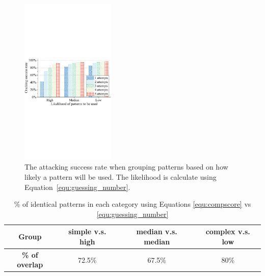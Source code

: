      \begin{figure}[!t]
            \centering
            \includegraphics[width=0.4\textwidth]{fig/usibility_crackingNum.pdf}
            \vspace{-3mm}
            \caption{The attacking success rate when grouping patterns based on how likely a pattern will be used.
            The likelihood is calculate using Equation~\ref{equ:guessing_number}.}
            \label{fig:usage-crackingNum}
            \vspace{-4mm}
        \end{figure}

        \begin{table}[!t]
            \centering
            \caption{\% of identical patterns in each category using Equations \ref{equ:compscore} vs \ref{equ:guessing_number}}
            \label{tab:reception_rate}
            \scriptsize
            \begin{tabular}{cccc}
                \toprule
                \textbf{Group}& simple v.s. high & median v.s. median & complex v.s. low \\
                \midrule
                \textbf{\% of overlap}  & 72.5\% & 67.5\% & 80\% \\
                \bottomrule
            \end{tabular}
            \vspace{-4mm}
        \end{table}

